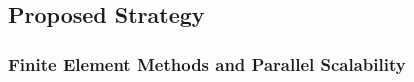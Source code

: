 \documentclass[11pt]{article}
\begin{document}

\subsection{Proposed Strategy} \label{sec:ProposedStrategy}

\subsubsection{Finite Element Methods and Parallel Scalability} \label{sec:FEM}
\end{document}

